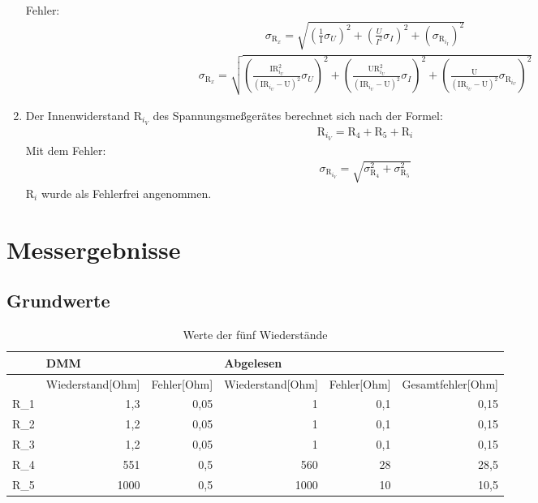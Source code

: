 \documentclass[12pt]{scrartcl}
\begin{document}
\begin{enumerate}
	Fehler:
	\begin{align}
	\sigma_{\text{R}_x}=
	\sqrt{\left(\frac{1}								{\text{I}}\sigma_U\right)^2+
	\left(\frac{U}{I^2}\sigma_I\right)^2+
	\left(\sigma_{\text{R}_{i_I}}\right)^2}
	\label{eqn:aufgabe_3_schaltung_2_sigma}
	\end{align}		
	\begin{align}
	\sigma_{\text{R}_x}=
	\sqrt{\left(\frac{\text{I}
	\text{R}_{i_U}^2}								{(\text{I}\text{R}_{i_U}-
	\text{U})^2}\sigma_U\right)^2+
	\left(\frac{\text{U}\text{R}_{i_U}^2}			{(\text{I}\text{R}_{i_U}-
	\text{U})^2}\sigma_I\right)^2+
	\left(\frac{\text{U}}							{(\text{I}\text{R}_{i_U}-
	\text{U})^2}\sigma_{
	\text{R}_{i_U}}\right)^2}
	\label{eqn:aufgabe_3_schaltung_1_sigma}
	\end{align}	 
	\item
	Der Innenwiderstand R$_{i_V}$ des Spannungsmeßgerätes berechnet sich nach der Formel:
	\begin{align}
	\text{R}_{i_V} = \text{R}_4 + \text{R}_5 + \text{R}_i 
	\label{eqn:aufgabe_4}
	\end{align}
	Mit dem Fehler:
	\begin{align}
	\sigma_{\text{R}_{i_V}} = \sqrt{\sigma_{\text{R}_4}^2 + \sigma_{\text{R}_5}^2}
	\label{eqn:aufgabe_4_sigma}
	\end{align}
	R$_i$ wurde als Fehlerfrei angenommen.
	
\end{enumerate}


\section{Messergebnisse}

\subsection{Grundwerte}
\begin{table}[htbp]
\caption{Werte der fünf Wiederstände}
\begin{tabular}{|l|r|r|r|r|r|}
\hline
 & \multicolumn{1}{l|}{DMM} & \multicolumn{1}{l|}{} & \multicolumn{1}{l|}{Abgelesen} & \multicolumn{1}{l|}{} & \multicolumn{1}{l|}{} \\ \hline
 & \multicolumn{1}{l|}{Wiederstand[Ohm]} & \multicolumn{1}{l|}{Fehler[Ohm]} & \multicolumn{1}{l|}{Wiederstand[Ohm]} & \multicolumn{1}{l|}{Fehler[Ohm]} & \multicolumn{1}{l|}{Gesamtfehler[Ohm]} \\ \hline
R\_1 & 1,3 & 0,05 & 1 & 0,1 & 0,15 \\ \hline
R\_2 & 1,2 & 0,05 & 1 & 0,1 & 0,15 \\ \hline
R\_3 & 1,2 & 0,05 & 1 & 0,1 & 0,15 \\ \hline
R\_4 & 551 & 0,5 & 560 & 28 & 28,5 \\ \hline
R\_5 & 1000 & 0,5 & 1000 & 10 & 10,5 \\ \hline
\end{tabular}
\label{grundwerte}
\end{table}
\end{document}

